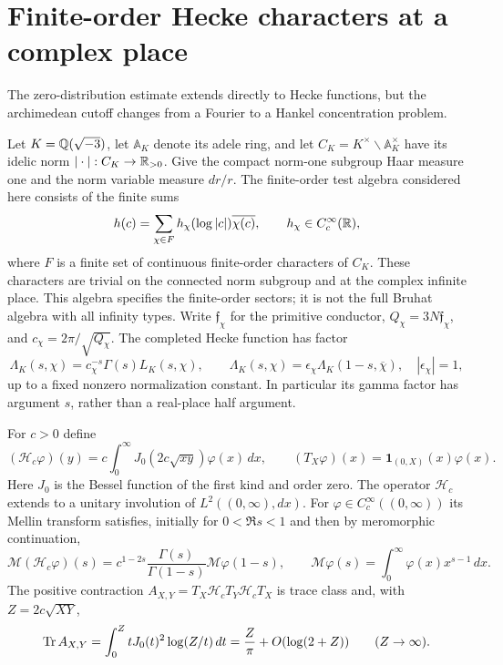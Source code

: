 \section{Finite-order Hecke characters at a complex place}
\label{sec:complex-place}
The zero-distribution estimate extends directly to Hecke functions, but
the archimedean cutoff changes from a Fourier to a Hankel concentration
problem.

Let $K=\mathbb Q(\sqrt{-3})$, let $\mathbb A_K$ denote its adele ring, and let
$C_K=K^\times\backslash\mathbb A_K^\times$ have its idelic norm
$|\cdot|:C_K\to\mathbb R_{>0}$. Give the compact norm-one subgroup Haar
measure one and the norm variable measure $dr/r$. The finite-order
test algebra considered here consists of the finite sums
\[
 h(c)=\sum_{\chi\in F}h_\chi(\log|c|)\overline{\chi(c)},
 \qquad h_\chi\in C_c^\infty(\mathbb R),
\]
where $F$ is a finite set of continuous finite-order characters of
$C_K$. These characters are trivial on the connected norm subgroup
and at the complex infinite place. This algebra specifies the
finite-order sectors; it is not the full Bruhat algebra with all
infinity types. Write $\mathfrak f_\chi$ for the primitive conductor,
$Q_\chi=3N\mathfrak f_\chi$, and $c_\chi=2\pi/\sqrt{Q_\chi}$.
The completed Hecke function has factor
\[
 \Lambda_K(s,\chi)=c_\chi^{-s}\Gamma(s)L_K(s,\chi),
 \qquad
 \Lambda_K(s,\chi)=\epsilon_\chi
                      \Lambda_K(1-s,\overline\chi),
 \quad |\epsilon_\chi|=1,
\]
up to a fixed nonzero normalization constant. In particular its gamma
factor has argument $s$, rather than a real-place half argument.

\begin{proposition}
\label{prop:complex-concentration}
For $c>0$ define
\[
 (\mathcal H_c\varphi)(y)
      =c\int_0^\infty J_0(2c\sqrt{xy})\varphi(x)\,dx,
 \qquad
 (T_X\varphi)(x)=\mathbf1_{(0,X)}(x)\varphi(x).
\]
Here $J_0$ is the Bessel function of the first kind and order zero.
The operator $\mathcal H_c$ extends to a unitary involution of
$L^2((0,\infty),dx)$. For $\varphi\in C_c^\infty((0,\infty))$ its
Mellin transform satisfies, initially for $0<\Re s<1$ and then
by meromorphic continuation,
\begin{equation}\label{eq:hankel-mellin}
 \mathcal M(\mathcal H_c\varphi)(s)
   =c^{1-2s}\frac{\Gamma(s)}{\Gamma(1-s)}
                       \mathcal M\varphi(1-s),
 \qquad
 \mathcal M\varphi(s)=\int_0^\infty\varphi(x)x^{s-1}\,dx.
\end{equation}
The positive contraction
$A_{X,Y}=T_X\mathcal H_cT_Y\mathcal H_cT_X$ is trace class and, with
$Z=2c\sqrt{XY}$,
\begin{equation}\label{eq:hankel-trace}
 \operatorname{Tr} A_{X,Y}
   =\int_0^Z tJ_0(t)^2\log(Z/t)\,dt
   =\frac Z\pi+O(\log(2+Z))\qquad(Z\to\infty).
\end{equation}
\end{proposition}

